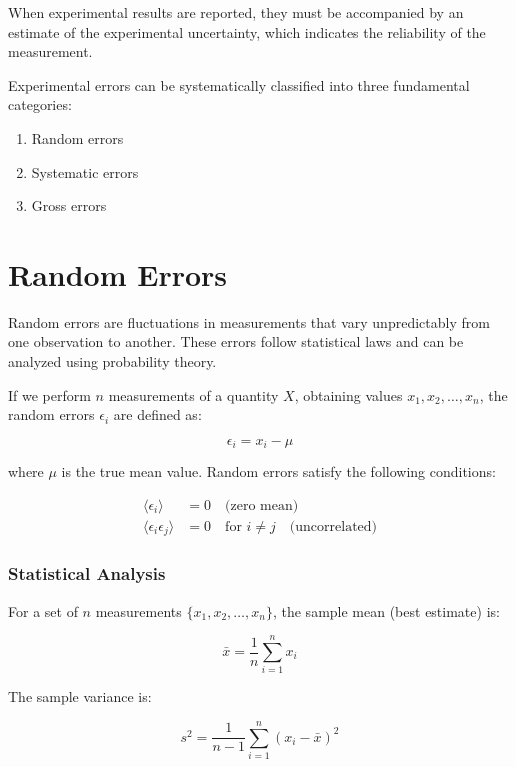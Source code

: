 \documentclass[twoside]{book}
\begin{document}
When experimental results are reported, they must be accompanied by an estimate of the experimental uncertainty, which indicates the reliability of the measurement.

Experimental errors can be systematically classified into three fundamental categories:
\begin{enumerate}
\item Random errors
\item Systematic errors
\item Gross errors
\end{enumerate}

\section{Random Errors}

Random errors are fluctuations in measurements that vary unpredictably from one observation to another. These errors follow statistical laws and can be analyzed using probability theory.

If we perform $n$ measurements of a quantity $X$, obtaining values $x_1, x_2, \ldots, x_n$, the random errors $\epsilon_i$ are defined as:

\begin{equation*}
\epsilon_i = x_i - \mu
\end{equation*}

where $\mu$ is the true mean value. Random errors satisfy the following conditions:

\begin{align*}
\langle \epsilon_i \rangle &= 0 \quad \text{(zero mean)} \\
\langle \epsilon_i \epsilon_j \rangle &= 0 \quad \text{for } i \neq j \quad \text{(uncorrelated)}
\end{align*}

\subsubsection{Statistical Analysis}

For a set of $n$ measurements $\{x_1, x_2, \ldots, x_n\}$, the sample mean (best estimate) is:

\begin{equation}
\bar{x} = \frac{1}{n}\sum_{i=1}^{n} x_i
\end{equation}

The sample variance is:

\begin{equation}
s^2 = \frac{1}{n-1}\sum_{i=1}^{n}(x_i - \bar{x})^2
\end{equation}
\end{document}
